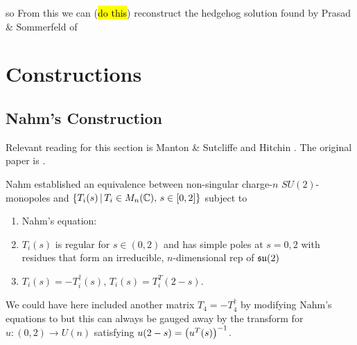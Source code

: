 \documentclass{article}
\begin{document}
\begin{example}
so 
From this we can (\hl{do this}) reconstruct the hedgehog solution found by Prasad \& Sommerfeld of 
\end{example}


\section{Constructions}
\subsection{Nahm's Construction}
Relevant reading for this section is Manton \& Sutcliffe \cite{Manton2004} and Hitchin \cite{Hitchin1983}. The original paper is \cite{Nahm1983}.

Nahm established an equivalence between non-singular charge-$n$ $SU(2)$-monopoles and $\left\{ T_i(s) \, | \, T_i \in M_n(\mathbb{C}), \, s \in [0,2] \right\}$ subject to 
\begin{enumerate}
	\item Nahm's equation:
	\item $T_i(s)$ is regular for $s \in (0,2)$ and has simple poles at $s=0,2$ with residues that form an irreducible, $n$-dimensional rep of $\mathfrak{su}(2)$
	\item $T_i(s) = -T_i^\dagger(s), \, T_i(s) = T^T_i(2-s)$. 
\end{enumerate}

\begin{remark}
	We could have here included another matrix $T_4 = -T_4^\dagger$ by modifying Nahm's equations to 
	but this can always be gauged away by the transform 
	for $u:(0,2) \to U(n)$ satisfying $u(2-s) = \left( u^T(s) \right)^{-1}$.
\end{remark}
\end{document}
